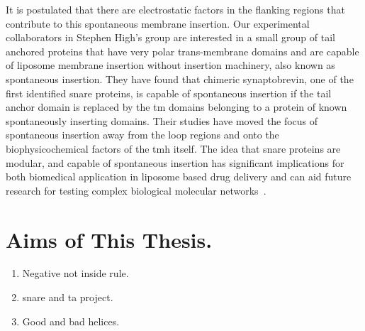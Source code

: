 It is postulated that there are electrostatic factors in the flanking regions that contribute to this spontaneous membrane insertion. Our experimental collaborators in Stephen High’s group are interested in a small group of tail anchored proteins that have very polar trans-membrane domains and are capable of liposome membrane insertion without insertion machinery, also known as spontaneous insertion. They have found that chimeric synaptobrevin, one of the first identified \gls{snare} proteins, is capable of spontaneous insertion if the tail anchor domain is replaced by the \gls{tm} domains belonging to a protein of known spontaneously inserting domains. Their studies have moved the focus of spontaneous insertion away from the loop regions and onto the biophysicochemical factors of the \gls{tmh} itself. The idea that \gls{snare} proteins are modular, and capable of spontaneous insertion has significant implications for both biomedical application in liposome based drug delivery and can aid future research for testing complex biological molecular networks~\cite{Allen2013, Nordlund2014}.






\section{Aims of This Thesis.}

\begin{enumerate}
  \item Negative not inside rule.
  \item \gls{snare} and \gls{ta} project.
  \item Good and bad helices.
\end{enumerate}
